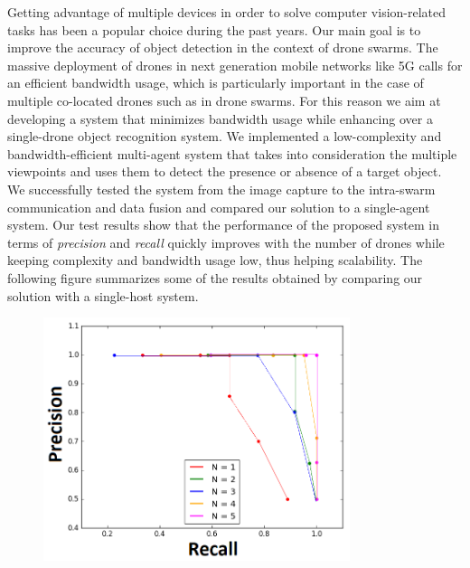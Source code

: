 \documentclass[10pt,conference,compsocconf]{IEEEtran}
\begin{document}
Getting advantage of multiple devices in order to solve computer vision-related tasks has been a popular choice during the past years. Our main goal is to improve the accuracy of object detection in the context of drone swarms. 
The massive deployment of drones in next generation mobile networks like 5G calls for an efficient bandwidth usage, which is particularly important in the case of multiple co-located drones such as in drone swarms. For this reason we aim at developing a system that minimizes bandwidth usage while enhancing over a single-drone object recognition system.
We implemented a low-complexity and bandwidth-efficient multi-agent system that takes into consideration the multiple viewpoints and uses them to detect the presence or absence of a target object. We successfully tested the system from the image capture to the intra-swarm communication and data fusion and compared our solution to a single-agent system. Our test results show that the performance of the proposed system in terms of \emph{precision} and \emph{recall} quickly improves with the number of drones while keeping complexity and bandwidth usage low, thus helping scalability.  The following figure summarizes some of the results obtained by comparing our solution with a single-host system.
\begin{figure}[h!]
	\centering
	\captionsetup{type=figure}
	\includegraphics[width=0.8\textwidth]{img/summary_majority_THIRD_N1_5_CONNECTED.png}
\end{figure}
\clearpage{}
\end{document}

